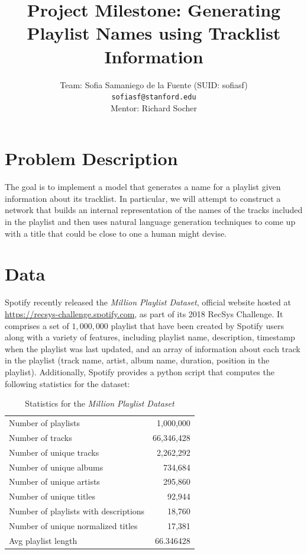 \documentclass{article} %
\title{Project Milestone: Generating Playlist Names using Tracklist Information}
\author{
    Team: Sofia Samaniego de la Fuente (SUID: sofiasf) \\
    \texttt{\footnotesize sofiasf@stanford.edu}\\ 
    Mentor: Richard Socher
}
\begin{document}
\maketitle


\section{Problem Description}
\label{description}
The goal is to implement a model that generates a name for a playlist given information about its tracklist. 
In particular, we will attempt to construct a network that builds an internal representation of the names of the tracks included in the playlist and then uses natural language generation techniques to come up with a title that could be close to one a human might devise. 

\section{Data}
\label{data}
Spotify recently released the \emph{Million Playlist Dataset}, official website hosted at \href{https://recsys-challenge.spotify.com}{https://recsys-challenge.spotify.com}, as part of its 2018 RecSys Challenge.
It comprises a set of $1,000,000$ playlist that have been created by Spotify users along with a variety of features, including playlist name, description, timestamp when the playlist was last updated, and an array of information about each track in the playlist (track name, artist, album name, duration, position in the playlist).
Additionally, Spotify provides a \textsf{python} script that computes the following statistics for the dataset:

\begin{table}[h!]
\caption{Statistics for the \emph{Million Playlist Dataset}}
\centering
 \begin{tabular}{|lr|} 
 \hline
 	Number of playlists & 1,000,000 \\
	Number of tracks & 66,346,428 \\
	Number of unique tracks & 2,262,292 \\
	Number of unique albums & 734,684 \\
	Number of unique artists & 295,860 \\
	Number of unique titles & 92,944 \\
	Number of playlists with descriptions & 18,760 \\
	Number of unique normalized titles & 17,381 \\
	Avg playlist length & 66.346428 \\     
 \hline
 \end{tabular}
\end{table}
\end{document}
